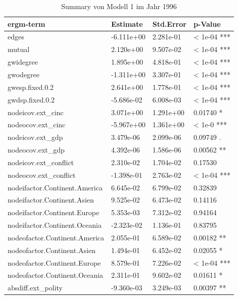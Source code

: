 \documentclass[a4paper,ngerman,oneside,titlepage,bibliography=totoc,11pt]{scrreprt}
\begin{document}
\begin{table}[ht]
	\centering
	\caption{Summary von Modell 1 im Jahr 1996}
		\begin{tabular}{l|l|l|l}
		
		\hline
		ergm-term 						   				  & Estimate      & Std.Error   & p-Value 				\\
		\hline
    edges                     				& -6.111e+00  &2.281e-01      & < 1e-04 *** \\
    mutual                   					&  2.120e+00  &9.507e-02      & < 1e-04  ***\\
    gwidegree                  				&  1.895e+00  &4.818e-01      & < 1e-04  ***\\
    gwodegree                     		& -1.311e+00  &3.307e-01      & < 1e-04  ***\\
    gwesp.fixed.0.2                   &  2.641e+00  &1.778e-01      & < 1e-04  ***\\
    gwdsp.fixed.0.2				    				& -5.686e-02  &6.008e-03      & < 1e-04  ***\\
    nodeicov.ext\_cinc         				&  3.071e+00  &1.291e+00      & 0.01740  *\\
    nodeocov.ext\_cinc         				& -5.967e+00  &1.361e+00      & < 1e-0  ***\\
    nodeicov.ext\_gdp          				&  3.479e-06  &2.099e-06      & 0.09749  .\\
    nodeocov.ext\_gdp          				&  4.392e-06  &1.586e-06      & 0.00562  **\\
    nodeicov.ext\_conflict     				&  2.310e-02  &1.704e-02      & 0.17530  \\
    nodeocov.ext\_conflict     				& -1.398e-01  &2.763e-02      & < 1e-04  ***\\
    nodeifactor.Continent.America     &  6.645e-02  &6.799e-02      & 0.32839  \\
		nodeifactor.Continent.Asien     	&  9.525e-02  &6.473e-02      & 0.14116  \\
		nodeifactor.Continent.Europe     	&  5.353e-03  &7.312e-02      & 0.94164  \\
		nodeifactor.Continent.Oceania     & -2.323e-02  &1.136e-01      & 0.83795  \\
    nodeofactor.Continent.America     &  2.055e-01  &6.589e-02      & 0.00182  **\\
		nodeofactor.Continent.Asien     	&  1.494e-01  &6.452e-02      & 0.02055  *\\
		nodeofactor.Continent.Europe     	&  8.579e-01  &7.226e-02      & < 1e-04  ***\\
		nodeofactor.Continent.Oceania     &  2.311e-01  &9.602e-02      & 0.01611  *\\
		absdiff.ext\_polity            		& -9.360e-03  &3.249e-03      & 0.00397 **\\
		\hline
		\end{tabular}
		\label{tab:model1}
\end{table}
\end{document}
